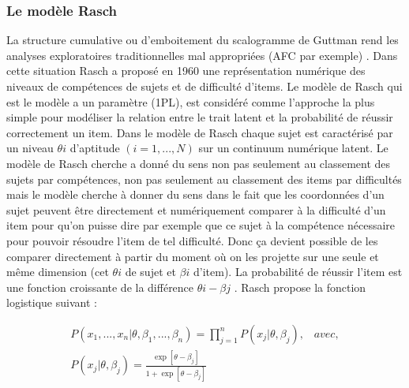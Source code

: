 \subsubsection{Le modèle Rasch}
La structure cumulative ou d’emboitement du scalogramme de Guttman rend les analyses exploratoires traditionnelles mal appropriées (AFC par exemple) . Dans cette situation Rasch a proposé en 1960 une représentation numérique des niveaux de compétences de sujets et de difficulté d’items. Le modèle de Rasch qui est le modèle a un paramètre (1PL), est considéré comme l’approche la plus simple pour modéliser la relation entre le trait latent et la probabilité de réussir correctement un item. Dans le modèle de Rasch chaque sujet est caractérisé par un niveau \(\displaystyle \theta i \) d’aptitude \(\displaystyle (i=1,...,N) \) sur un continuum numérique latent.
Le modèle de Rasch cherche a donné du sens non pas seulement au classement des sujets par compétences, non pas seulement au classement des items par difficultés mais le modèle cherche à donner du sens dans le fait que les coordonnées d’un sujet peuvent être directement et numériquement comparer à la difficulté d’un item pour qu’on puisse dire par exemple que ce sujet à la compétence nécessaire pour pouvoir résoudre l’item de tel difficulté. Donc ça devient possible de les comparer directement à partir du moment où on les projette sur une seule et même dimension (cet \(\displaystyle \theta i \) de sujet et \(\displaystyle \beta i \) d’item). La probabilité de réussir l’item est une fonction croissante de la différence \(\displaystyle \theta i - \beta j\) \cite{yvonnick_2019}.
Rasch propose la fonction logistique suivant \cite{mislevy1994evidence}:




\begin{equation}
    \begin{split}
		P(x_{1},...,x_{n} | \theta, \beta_{1},...,\beta_{n}) = \prod_{j=1}^{n} P(x_{j}| \theta, \beta_{j}), \hspace{10pt} avec, \\
		P(x_{j}| \theta, \beta_{j}) = \frac{\exp \left[\theta - \beta_{j} \right]  }{1+ \exp \left[ \theta - \beta_{j} \right] }
	\end{split}
	\label{posterior_probability_distribution}
\end{equation}

